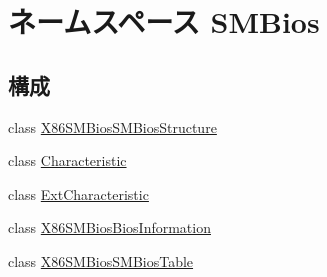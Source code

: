 \hypertarget{namespaceSMBios}{
\section{ネームスペース SMBios}
\label{namespaceSMBios}
}
\subsection*{構成}
\begin{DoxyCompactItemize}
\item 
class \hyperlink{classSMBios_1_1X86SMBiosSMBiosStructure}{X86SMBiosSMBiosStructure}
\item 
class \hyperlink{classSMBios_1_1Characteristic}{Characteristic}
\item 
class \hyperlink{classSMBios_1_1ExtCharacteristic}{ExtCharacteristic}
\item 
class \hyperlink{classSMBios_1_1X86SMBiosBiosInformation}{X86SMBiosBiosInformation}
\item 
class \hyperlink{classSMBios_1_1X86SMBiosSMBiosTable}{X86SMBiosSMBiosTable}
\end{DoxyCompactItemize}
